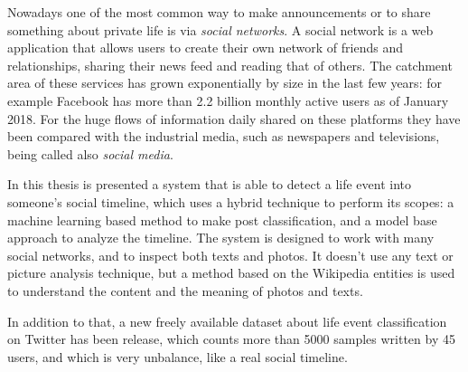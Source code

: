 Nowadays one of the most common way to make announcements or to share something about private life is via \textit{social networks}. A social network is a web application that allows users to create their own network of friends and relationships, sharing their news feed and reading that of others. The 
catchment area of these services has grown exponentially by size in the last few years: for example Facebook has more than 2.2 billion monthly active users as of January 2018. For the huge flows of information daily shared on these platforms they have been compared with the industrial media, such as newspapers and televisions, being called also \textit{social media}.

In this thesis is presented a system that is able to detect a life event into someone's social timeline, which uses a hybrid technique to perform its scopes: a machine learning based method to make post classification, and a model base approach to analyze the timeline. The system is designed to work with many social networks, and to inspect both texts and photos. It doesn't use any text or picture analysis technique, but a method based on the Wikipedia entities is used to understand the content and the meaning of photos and texts.

In addition to that, a new freely available dataset about life event classification on Twitter has been release, which counts more than 5000 samples written by 45 users, and which is very unbalance, like a real social timeline.

